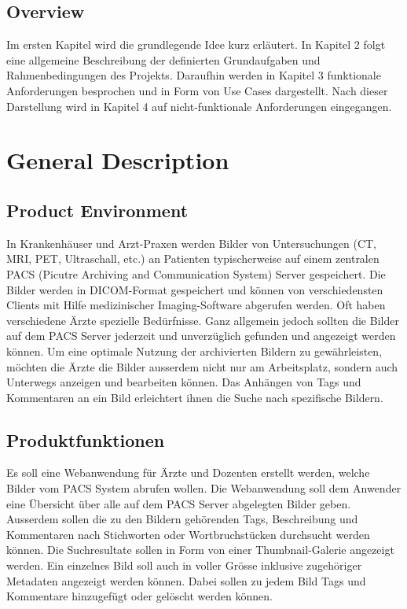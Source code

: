 \documentclass[a4paper]{srs}
\begin{document}
\subsection{Overview}
Im ersten Kapitel wird die grundlegende Idee kurz erläutert. In Kapitel 2 folgt eine allgemeine Beschreibung der definierten Grundaufgaben und Rahmenbedingungen des Projekts. Daraufhin werden in Kapitel 3 funktionale Anforderungen besprochen und in Form von Use Cases dargestellt. Nach dieser Darstellung wird in Kapitel 4 auf nicht-funktionale Anforderungen eingegangen.

	\section{General Description}

\subsection{Product Environment}
In Krankenhäuser und Arzt-Praxen werden Bilder von Untersuchungen (CT, MRI, PET, Ultraschall, etc.) an Patienten typischerweise auf einem zentralen PACS (Picutre Archiving and Communication System) Server gespeichert. Die Bilder werden in DICOM-Format gespeichert und können von verschiedensten Clients mit Hilfe medizinischer Imaging-Software abgerufen werden. Oft haben verschiedene Ärzte spezielle Bedürfnisse. Ganz allgemein jedoch sollten die Bilder auf dem PACS Server jederzeit und unverzüglich gefunden und angezeigt werden können. Um eine optimale Nutzung der archivierten Bildern zu gewährleisten, möchten die Ärzte die Bilder ausserdem nicht nur am Arbeitsplatz, sondern auch Unterwegs anzeigen und bearbeiten können. Das Anhängen von Tags und Kommentaren an ein Bild erleichtert ihnen die Suche nach spezifische Bildern.

\subsection{Produktfunktionen}
Es soll eine Webanwendung für Ärzte und Dozenten erstellt werden, welche Bilder vom PACS System abrufen wollen. 
Die Webanwendung soll dem Anwender eine Übersicht über alle auf dem PACS Server abgelegten Bilder geben. Ausserdem sollen die zu den Bildern gehörenden Tags, Beschreibung und Kommentaren nach Stichworten oder Wortbruchstücken durchsucht werden können. Die Suchresultate sollen in Form von einer Thumbnail-Galerie angezeigt werden. Ein einzelnes Bild soll auch in voller Grösse inklusive zugehöriger Metadaten angezeigt werden können. Dabei sollen zu jedem Bild Tags und Kommentare hinzugefügt oder gelöscht werden können.
\end{document}

